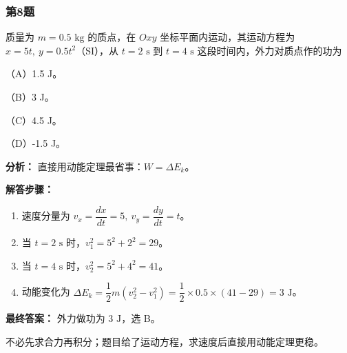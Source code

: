 \documentclass[12pt,a4paper]{ctexart}
\begin{document}
\subsubsection*{第8题}
\begin{tcolorbox}[colback=gray!2!white,colframe=black!60,title={题目}]
质量为 \(m=0.5\text{ kg}\) 的质点，在 \(Oxy\) 坐标平面内运动，其运动方程为 \(x=5t,\ y=0.5t^2\)（SI），从 \(t=2\text{ s}\) 到 \(t=4\text{ s}\) 这段时间内，外力对质点作的功为\par
（A）1.5 J。\par
（B）3 J。\par
（C）4.5 J。\par
（D）-1.5 J。\par
\end{tcolorbox}
\begin{tcolorbox}[colback=blue!2!white,colframe=blue!55!black,title={完整答案}]
\textbf{分析：}
直接用动能定理最省事：\(W=\Delta E_k\)。\par
\textbf{解答步骤：}
\begin{enumerate}
\item 速度分量为 \(v_x=\dfrac{dx}{dt}=5,\ v_y=\dfrac{dy}{dt}=t\)。
\item 当 \(t=2\text{ s}\) 时，\(v_1^2=5^2+2^2=29\)。
\item 当 \(t=4\text{ s}\) 时，\(v_2^2=5^2+4^2=41\)。
\item 动能变化为 \(\Delta E_k=\dfrac12 m(v_2^2-v_1^2)=\dfrac12\times 0.5\times (41-29)=3\text{ J}\)。
\end{enumerate}
\textbf{最终答案：}
外力做功为 \(3\text{ J}\)，选 B。\par
\end{tcolorbox}
\begin{tcolorbox}[colback=red!2!white,colframe=red!55!black,title={易错点}]
不必先求合力再积分；题目给了运动方程，求速度后直接用动能定理更稳。\par
\end{tcolorbox}
\end{document}
